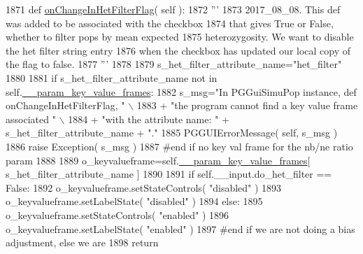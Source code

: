 \begin{DoxyCode}
1871     \textcolor{keyword}{def }\hyperlink{classnegui_1_1pgguisimupop_1_1PGGuiSimuPop_a9db4c2db114a83e751c210d01f79b270}{onChangeInHetFilterFlag}( self ):
1872         \textcolor{stringliteral}{'''}
1873 \textcolor{stringliteral}{        2017\_08\_08.  This def was added to be associated with the checkbox}
1874 \textcolor{stringliteral}{        that gives True or False, whether to filter pops by mean expected}
1875 \textcolor{stringliteral}{        heterozygosity.  We want to disable the het filter string entry }
1876 \textcolor{stringliteral}{        when the checkbox has updated our local copy of the flag to false.}
1877 \textcolor{stringliteral}{        '''}
1878 
1879         s\_het\_filter\_attribute\_name=\textcolor{stringliteral}{"het\_filter"}
1880 
1881         \textcolor{keywordflow}{if} s\_het\_filter\_attribute\_name \textcolor{keywordflow}{not} \textcolor{keywordflow}{in} self.\hyperlink{classnegui_1_1pgguisimupop_1_1PGGuiSimuPop_a272523ce4bad4d1073c506e858c59996}{\_\_param\_key\_value\_frames}:
1882             s\_msg=\textcolor{stringliteral}{"In PGGuiSimuPop instance, def onChangeInHetFilterFlag, "} \(\backslash\)
1883                         + \textcolor{stringliteral}{"the program cannot find a key value frame associated "} \(\backslash\)
1884                         + \textcolor{stringliteral}{"with the attribute name: "} + s\_het\_filter\_attribute\_name + \textcolor{stringliteral}{"."}
1885             PGGUIErrorMessage( self, s\_msg )
1886             \textcolor{keywordflow}{raise} Exception( s\_msg )
1887         \textcolor{comment}{#end if no key val frame for the nb/ne ratio param}
1888 
1889         o\_keyvalueframe=self.\hyperlink{classnegui_1_1pgguisimupop_1_1PGGuiSimuPop_a272523ce4bad4d1073c506e858c59996}{\_\_param\_key\_value\_frames}[ s\_het\_filter\_attribute\_name 
      ]
1890 
1891         \textcolor{keywordflow}{if} self.\_\_input.do\_het\_filter == \textcolor{keyword}{False}:
1892             o\_keyvalueframe.setStateControls( \textcolor{stringliteral}{"disabled"} )
1893             o\_keyvalueframe.setLabelState( \textcolor{stringliteral}{"disabled"} )
1894         \textcolor{keywordflow}{else}:
1895             o\_keyvalueframe.setStateControls( \textcolor{stringliteral}{"enabled"} )
1896             o\_keyvalueframe.setLabelState( \textcolor{stringliteral}{"enabled"} )
1897         \textcolor{comment}{#end if we are not doing a bias adjustment, else we are }
1898         \textcolor{keywordflow}{return}
\end{DoxyCode}
